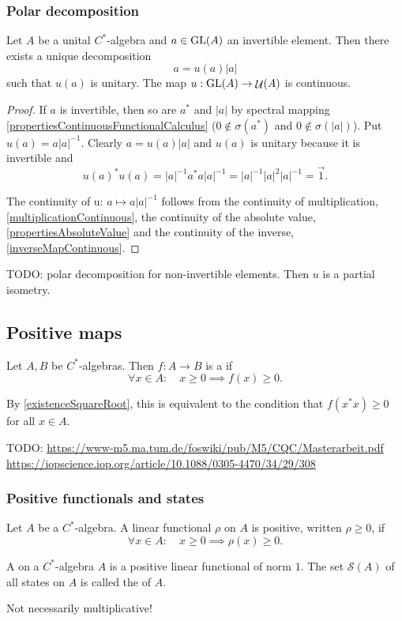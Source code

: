 \subsubsection{Polar decomposition}
\begin{proposition}
Let $A$ be a unital $C^*$-algebra and $a\in \operatorname{GL}(A)$ an invertible element. Then there exists a unique decomposition
\[ a = u(a) |a| \]
such that $u(a)$ is unitary. The map $u: \operatorname{GL}(A) \to \mathop{\mathcal{U}}\nolimits(A)$ is continuous.
\end{proposition}
\begin{proof}
If $a$ is invertible, then so are $a^*$ and $|a|$ by spectral mapping \ref{propertiesContinuousFunctionalCalculus} ($0\notin \sigma(a^*)$ and $0\notin \sigma(|a|)$). Put $u(a) = a|a|^{-1}$. Clearly $a = u(a)|a|$ and $u(a)$ is unitary because it is invertible and
\[ u(a)^*u(a) = |a|^{-1}a^*a|a|^{-1} = |a|^{-1}|a|^2|a|^{-1} = \vec{1}. \]

The continuity of u: $a\mapsto a|a|^{-1}$ follows from the continuity of multiplication, \ref{multiplicationContinuous}, the continuity of the absolute value, \ref{propertiesAbsoluteValue} and the continuity of the inverse, \ref{inverseMapContinuous}.
\end{proof}
TODO: polar decomposition for non-invertible elements. Then $u$ is a partial isometry.

\subsection{Positive maps}
\begin{definition}
Let $A,B$ be $C^*$-algebras. Then $f:A\to B$ is a  if
\[ \forall x\in A: \quad x\geq 0 \implies f(x)\geq 0. \]
\end{definition}
By \ref{existenceSquareRoot}, this is equivalent to the condition that $f(x^*x)\geq 0$ for all $x\in A$.

TODO: \url{https://www-m5.ma.tum.de/foswiki/pub/M5/CQC/Masterarbeit.pdf}
\url{https://iopscience.iop.org/article/10.1088/0305-4470/34/29/308}

\subsubsection{Positive functionals and states}
\begin{definition}
Let $A$ be a $C^*$-algebra. A linear functional $\rho$ on $A$ is positive, written $\rho\geq 0$, if
\[ \forall x\in A: \quad x\geq 0 \implies \rho(x)\geq 0. \]
\end{definition}
\begin{definition}
A  on a $C^*$-algebra $A$ is a positive linear functional of norm $1$. The set $\mathcal{S}(A)$ of all states on $A$ is called the  of $A$.
\end{definition}
Not necessarily multiplicative!

